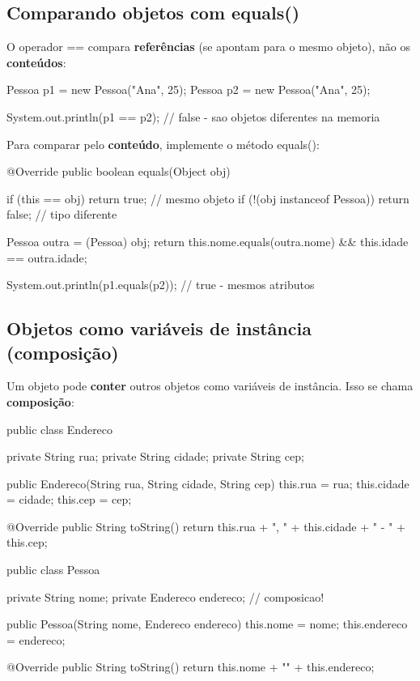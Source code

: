 \documentclass[11pt,a4paper]{article}
\renewcommand{\texttt}[1]{{\color{javaCodeInline}\small\ttfamily #1}}
\begin{document}
\subsection{Comparando objetos com \texttt{equals()}}

O operador \texttt{==} compara \textbf{referências} (se apontam para o mesmo objeto), não os \textbf{conteúdos}:

\begin{javacode}
Pessoa p1 = new Pessoa("Ana", 25);
Pessoa p2 = new Pessoa("Ana", 25);

System.out.println(p1 == p2); // false - sao objetos diferentes na memoria
\end{javacode}

Para comparar pelo \textbf{conteúdo}, implemente o método \texttt{equals()}:

\begin{javacode}
@Override
public boolean equals(Object obj) {
    if (this == obj) return true;           // mesmo objeto
    if (!(obj instanceof Pessoa)) return false; // tipo diferente

    Pessoa outra = (Pessoa) obj;
    return this.nome.equals(outra.nome) && this.idade == outra.idade;
}
\end{javacode}

\begin{javacode}
System.out.println(p1.equals(p2)); // true - mesmos atributos
\end{javacode}

\subsection{Objetos como variáveis de instância (composição)}

Um objeto pode \textbf{conter} outros objetos como variáveis de instância. Isso se chama \textbf{composição}:

\begin{javacode}
public class Endereco {
    private String rua;
    private String cidade;
    private String cep;

    public Endereco(String rua, String cidade, String cep) {
        this.rua = rua;
        this.cidade = cidade;
        this.cep = cep;
    }

    @Override
    public String toString() {
        return this.rua + ", " + this.cidade + " - " + this.cep;
    }
}
\end{javacode}

\begin{javacode}
public class Pessoa {
    private String nome;
    private Endereco endereco; // composicao!

    public Pessoa(String nome, Endereco endereco) {
        this.nome = nome;
        this.endereco = endereco;
    }

    @Override
    public String toString() {
        return this.nome + "\n  " + this.endereco;
    }
}
\end{javacode}
\end{document}
